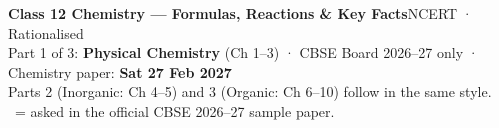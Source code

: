 \documentclass[9pt,a4paper]{extarticle}
\begin{document}
\footnotesize

\begin{tcolorbox}[enhanced,colback=navy,colframe=navy,arc=2pt,left=6pt,right=6pt,top=3pt,bottom=3pt]
\color{white}\sffamily
{\Large\bfseries Class 12 Chemistry — Formulas, Reactions \& Key Facts}\hfill{\small NCERT · Rationalised}\\[1pt]
{\footnotesize Part 1 of 3: \textbf{Physical Chemistry} (Ch 1--3) \;·\; CBSE Board 2026--27 only \;·\; Chemistry paper: \textbf{Sat 27 Feb 2027}}\\[2pt]
{\scriptsize Parts 2 (Inorganic: Ch 4--5) and 3 (Organic: Ch 6--10) follow in the same style. \SQP\ = asked in the official CBSE 2026--27 sample paper.}
\end{tcolorbox}
\vspace{-1pt}
\end{document}
